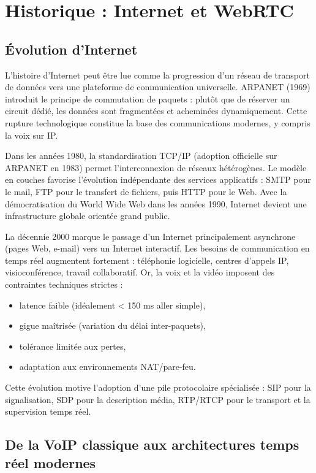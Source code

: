 \documentclass[12pt,a4paper]{article}
\begin{document}
\section{Historique : Internet et WebRTC}

\subsection{Évolution d'Internet}

L'histoire d'Internet peut être lue comme la progression d'un réseau de transport de données vers une plateforme de communication universelle. ARPANET (1969) introduit le principe de commutation de paquets : plutôt que de réserver un circuit dédié, les données sont fragmentées et acheminées dynamiquement. Cette rupture technologique constitue la base des communications modernes, y compris la voix sur IP.

Dans les années 1980, la standardisation TCP/IP (adoption officielle sur ARPANET en 1983) permet l'interconnexion de réseaux hétérogènes. Le modèle en couches favorise l'évolution indépendante des services applicatifs : SMTP pour le mail, FTP pour le transfert de fichiers, puis HTTP pour le Web. Avec la démocratisation du World Wide Web dans les années 1990, Internet devient une infrastructure globale orientée grand public.

La décennie 2000 marque le passage d'un Internet principalement asynchrone (pages Web, e-mail) vers un Internet interactif. Les besoins de communication en temps réel augmentent fortement : téléphonie logicielle, centres d'appels IP, visioconférence, travail collaboratif. Or, la voix et la vidéo imposent des contraintes techniques strictes :
\begin{itemize}[leftmargin=1.2cm]
    \item latence faible (idéalement < 150 ms aller simple),
    \item gigue maîtrisée (variation du délai inter-paquets),
    \item tolérance limitée aux pertes,
    \item adaptation aux environnements NAT/pare-feu.
\end{itemize}

Cette évolution motive l'adoption d'une pile protocolaire spécialisée : SIP pour la signalisation, SDP pour la description média, RTP/RTCP pour le transport et la supervision temps réel.

\subsection{De la VoIP classique aux architectures temps réel modernes}
\end{document}

